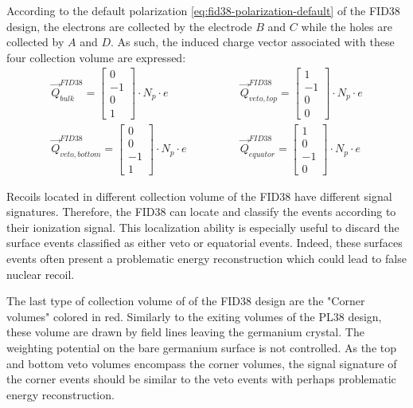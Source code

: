 According to the default polarization \ref{eq:fid38-polarization-default} of the FID38 design, the electrons are collected by the electrode $B$ and $C$ while the holes are collected by $A$ and $D$. As such, the induced charge vector associated with these four collection volume are expressed:
\begin{equation}
\label{eq:fid38-induced-charges}
\begin{array}{rr}
\vec{Q}_{bulk}^{FID38} =
\begin{bmatrix}
0 \\ -1 \\ 0 \\ 1
\end{bmatrix}
\cdot N_p \cdot e
\quad \quad
&
\quad \quad
\vec{Q}_{veto,top}^{FID38} =
\begin{bmatrix}
1 \\ -1 \\ 0 \\ 0
\end{bmatrix}
\cdot N_p \cdot e
\\
\vec{Q}_{veto,bottom}^{FID38} =
\begin{bmatrix}
0 \\ 0 \\ -1 \\ 1
\end{bmatrix}
\cdot N_p \cdot e
\quad \quad
&
\quad \quad
\vec{Q}_{equator}^{FID38} =
\begin{bmatrix}
1 \\ 0 \\ -1 \\ 0
\end{bmatrix}
\cdot N_p \cdot e
\end{array}
\end{equation}

Recoils located in different collection volume of the FID38 have different signal signatures. Therefore, the FID38 can locate and classify the events according to their ionization signal. This localization ability is especially useful to discard the surface events classified as either veto or equatorial events. Indeed, these surfaces events often present a problematic energy reconstruction which could lead to false nuclear recoil.

The last type of collection volume of of the FID38 design are the "Corner volumes" colored in red. Similarly to the exiting volumes of the PL38 design, these volume are drawn by field lines leaving the germanium crystal. The weighting potential on the bare germanium surface is not controlled. As the top and bottom veto volumes encompass the corner volumes, the signal signature of the corner events should be similar to the veto events with perhaps problematic energy reconstruction.

